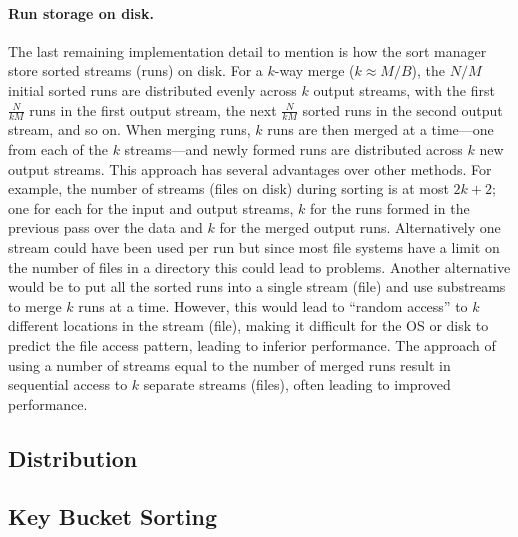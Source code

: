 \paragraph{Run storage on disk.} The last remaining implementation detail
to mention is how the sort manager store sorted streams (runs) on
disk.  For a $k$-way merge ($k\approx M/B$), the $N/M$ initial sorted
runs are distributed evenly across $k$ output streams, with the first
$\frac{N}{kM}$ runs in the first output stream, the next
$\frac{N}{kM}$ sorted runs in the second output stream, and so on.
When merging runs, $k$ runs are then merged at a time---one from each
of the $k$ streams---and newly formed runs are distributed across $k$
new output streams. This approach
has several advantages over other methods. For example, the number of
streams (files on disk) during sorting is at most $2k+2$; one for each
for the input and output streams, $k$ for the runs formed in the
previous pass over the data and $k$ for the merged output runs.
Alternatively one stream could have been used per run but since most
file systems have a limit on the number of files in a directory this
could lead to problems. Another alternative would be to put all the
sorted runs into a single stream (file) and use substreams to merge
$k$ runs at a time.  However, this would lead to ``random access'' to
$k$ different locations in the stream (file), making it difficult for
the OS or disk to predict the file access pattern, leading to inferior
performance.  The approach of using a number of streams equal to the
number of merged runs result in sequential access to $k$ separate
streams (files), often leading to improved performance.





\subsection{Distribution}

\tobewritten


\subsection{Key Bucket Sorting}

\tobewritten

